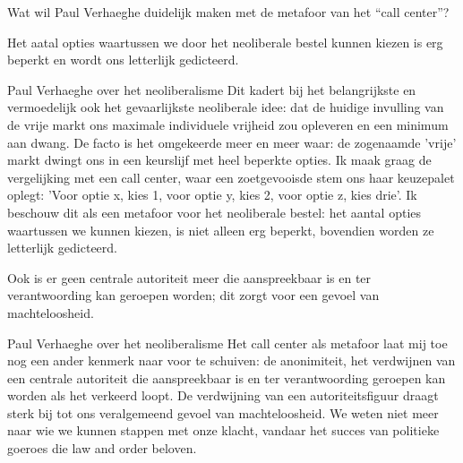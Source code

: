\documentclass[main.tex]{subfiles}
\begin{document}
\begin{examenvraag}
    \begin{vraag}
        Wat wil Paul Verhaeghe duidelijk maken met de metafoor van het “call 
        center”?
    \end{vraag}
	
    \begin{antwoord}
    Het aatal opties waartussen we door het neoliberale bestel kunnen kiezen is 
    erg beperkt en wordt ons letterlijk gedicteerd.

    
    
    \begin{citaat}{Paul Verhaeghe over het neoliberalisme}
    Dit kadert bij het belangrijkste en vermoedelijk ook het gevaarlijkste 
    neoliberale idee: dat de huidige invulling van de vrije markt ons
	maximale individuele vrijheid zou opleveren en een minimum aan dwang. De facto 
	is het omgekeerde meer en meer waar: de zogenaamde 'vrije' markt dwingt ons in 
	een keurslijf met heel beperkte
	opties. Ik maak graag de vergelijking met een call center, waar een 
	zoetgevooisde stem ons haar
	keuzepalet oplegt: 'Voor optie x, kies 1, voor optie y, kies 2, voor optie z, 		kies drie'. Ik beschouw dit
	als een metafoor voor het neoliberale bestel: het aantal opties waartussen we 
	kunnen kiezen, is niet
	alleen erg beperkt, bovendien worden ze letterlijk gedicteerd.
	\end{citaat}
	
	Ook is er geen centrale autoriteit meer die aanspreekbaar is en ter 	
    verantwoording kan geroepen worden; dit zorgt voor een gevoel van 	
    machteloosheid.	
	
	\begin{citaat}{Paul Verhaeghe over het neoliberalisme}
Het call center als metafoor laat mij toe nog een ander kenmerk naar voor te schuiven: de
anonimiteit, het verdwijnen van een centrale autoriteit die aanspreekbaar is en ter verantwoording
geroepen kan worden als het verkeerd loopt. De verdwijning van een autoriteitsfiguur draagt sterk bij
tot ons veralgemeend gevoel van machteloosheid. We weten niet meer naar wie we kunnen stappen
met onze klacht, vandaar het succes van politieke goeroes die law and order beloven.
	\end{citaat}
	
	\end{antwoord}
\end{examenvraag}
\end{document}
